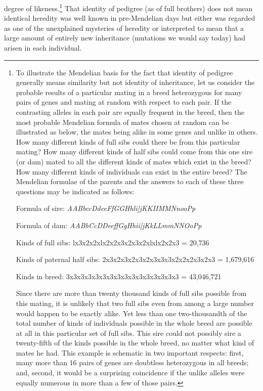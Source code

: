 degree of likeness.\footnote{To illustrate the Mendelian basis for the fact
that identity of pedigree generally means similarity but not identity of
inheritance, let us consider the probable results of a particular mating in
a breed heterozygous for many pairs of genes and mating at random with
respect to each pair. If the contrasting alleles in each pair are equally
frequent in the breed, then the most probable Mendelian formula of mates
chosen at random can be illustrated as below, the mates being alike in some genes
and unlike in others. How many different kinds of full sibs could there be from this
particular mating? How many different kinds of half sibs could come from this one sire
(or dam) mated to all the different kinds of mates which exist in the breed? How many
different kinds of individuals can exist in the entire breed? The Mendelian formulae
of the parents and the answers to each of these three questions may be indicated as
follows:

Formula of sire: \textit{AABbccDdeeFfGGHhli]jKKIIMMNnooPp}

Formula of dam: \textit{AABbCcDDeeffGgHhii]jKkLLmmNNOoPp}

Kinds of full sibs: lx3x2x2xlx2x2x3x2x3x2xlxlx2x2x3 = 20,736

Kinds of paternal half sibs: 2x3x2x3x2x3x2x3x3x3x2x2x2x3x2x3 = 1,679,616

Kinds in breed: 3x3x3x3x3x3x3x3x3x3x3x3x3x3x3x3 = 43,046,721

Since there are more than twenty thousand kinds of full sibs possible from this
mating, it is unlikely that two full sibs even from among a large number would happen
to be exactly alike. Yet less than one two-thousandth of the total number of kinds
of individuals possible in the whole breed are possible at all in this particular set of
full sibs. This sire could not possibly sire a twenty-fifth of the kinds possible in the
whole breed, no matter what kind of mates he had. This example is schematic in two
important respects: first, many more than 16 pairs of genes are doubtless heterozygous
in all breeds; and, second, it would be a surprising coincidence if the unlike
alleles were equally numerous in more than a few of those pairs.} That identity of pedigree
(as of full brothers) does not mean identical heredity was well known in pre-Mendelian
days but either was regarded as one of the unexplained mysteries of
heredity or interpreted to mean that a large amount of entirely new
inheritance (mutations we would say today) had arisen in each individual.

